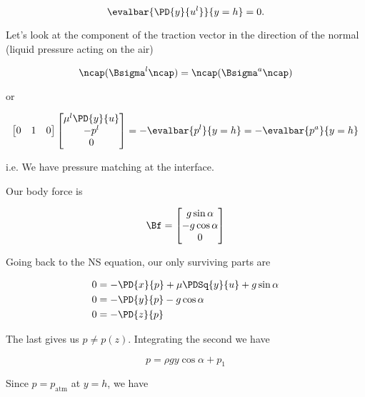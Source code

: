 \begin{equation}\label{eqn:continuumL12:310}
\evalbar{\PD{y}{u^l}}{y = h} = 0.
\end{equation}

Let's look at the component of the traction vector in the direction of the normal (liquid pressure acting on the air)

\begin{equation}\label{eqn:continuumL12:330}
\ncap (\Bsigma^l \ncap) = \ncap (\Bsigma^a \ncap) 
\end{equation}

or

\begin{equation}\label{eqn:continuumL12:350}
\begin{bmatrix}
0 & 1 & 0
\end{bmatrix}
\begin{bmatrix}
\mu^l \PD{y}{u} \\
-p^l \\
0
\end{bmatrix}
= -\evalbar{p^l}{y = h} = -\evalbar{p^a}{y = h}
\end{equation}

i.e. We have pressure matching at the interface.

Our body force is

\begin{equation}\label{eqn:continuumL12:370}
\Bf = 
\begin{bmatrix}
g \sin\alpha \\
-g \cos\alpha \\
0
\end{bmatrix}
\end{equation}

Going back to the NS equation, our only surviving parts are

\begin{align}\label{eqn:continuumL12:390}
0 &= -\PD{x}{p} + \mu \PDSq{y}{u} + g \sin\alpha \\
0 &= -\PD{y}{p} - g \cos\alpha \\
0 &= -\PD{z}{p} 
\end{align}

The last gives us $p \ne p(z)$.  Integrating the second we have

\begin{equation}\label{eqn:continuumL12:410}
p = \rho g y \cos\alpha + p_1
\end{equation}

Since $p = p_{\text{atm}}$ at $y = h$, we have

